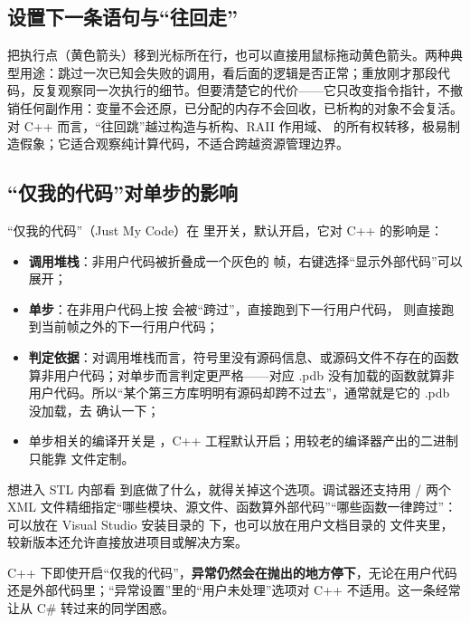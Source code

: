\subsection{设置下一条语句与“往回走”}

把执行点（黄色箭头）移到光标所在行，也可以直接用鼠标拖动黄色箭头。两种典型用途：跳过一次已知会失败的调用，看后面的逻辑是否正常；重放刚才那段代码，反复观察同一次执行的细节。但要清楚它的代价——它只改变指令指针，不撤销任何副作用：变量不会还原，已分配的内存不会回收，已析构的对象不会复活。对 C++ 而言，“往回跳”越过构造与析构、RAII 作用域、 的所有权转移，极易制造假象；它适合观察纯计算代码，不适合跨越资源管理边界。

\subsection{“仅我的代码”对单步的影响}

“仅我的代码”（Just My Code）在  里开关，默认开启，它对 C++ 的影响是：

\begin{itemize}
  \item \textbf{调用堆栈}：非用户代码被折叠成一个灰色的 \code{[外部代码]} 帧，右键选择“显示外部代码”可以展开；
  \item \textbf{单步}：在非用户代码上按  会被“跨过”，直接跑到下一行用户代码， 则直接跑到当前帧之外的下一行用户代码；
  \item \textbf{判定依据}：对调用堆栈而言，符号里没有源码信息、或源码文件不存在的函数算非用户代码；对单步而言判定更严格——对应 .pdb 没有加载的函数就算非用户代码。所以“某个第三方库明明有源码却跨不过去”，通常就是它的 .pdb 没加载，去  确认一下；
  \item 单步相关的编译开关是 ，C++ 工程默认开启；用较老的编译器产出的二进制只能靠  文件定制。
\end{itemize}

想进入 STL 内部看  到底做了什么，就得关掉这个选项。调试器还支持用  /  两个 XML 文件精细指定“哪些模块、源文件、函数算外部代码”“哪些函数一律跨过”：可以放在 Visual Studio 安装目录的  下，也可以放在用户文档目录的  文件夹里，较新版本还允许直接放进项目或解决方案。

\begin{warnbox}[注意]
C++ 下即使开启“仅我的代码”，\textbf{异常仍然会在抛出的地方停下}，无论在用户代码还是外部代码里；“异常设置”里的“用户未处理”选项对 C++ 不适用。这一条经常让从 C\# 转过来的同学困惑。
\end{warnbox}

